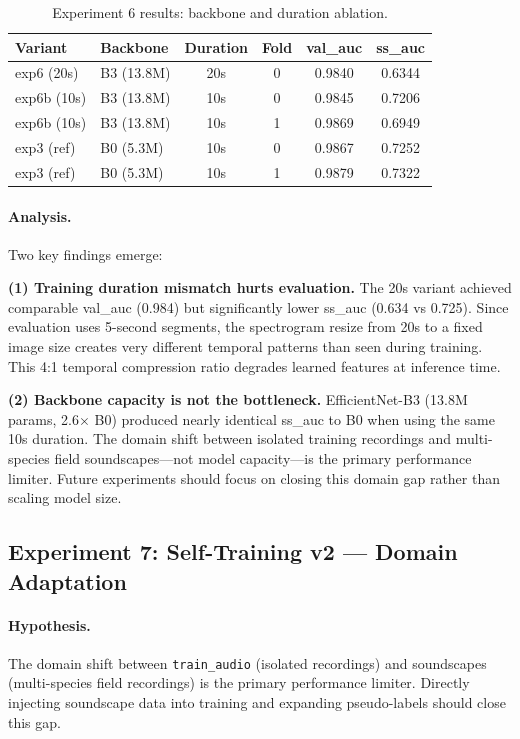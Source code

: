 \begin{table}[h]
\centering
\caption{Experiment 6 results: backbone and duration ablation.}
\label{tab:exp6}
\begin{tabular}{llcccc}
\hline
\textbf{Variant} & \textbf{Backbone} & \textbf{Duration} & \textbf{Fold} & \textbf{val\_auc} & \textbf{ss\_auc} \\
\hline
exp6 (20s)  & B3 (13.8M) & 20s & 0 & 0.9840 & 0.6344 \\
exp6b (10s) & B3 (13.8M) & 10s & 0 & 0.9845 & 0.7206 \\
exp6b (10s) & B3 (13.8M) & 10s & 1 & 0.9869 & 0.6949 \\
\hline
exp3 (ref)  & B0 (5.3M)  & 10s & 0 & 0.9867 & 0.7252 \\
exp3 (ref)  & B0 (5.3M)  & 10s & 1 & 0.9879 & 0.7322 \\
\hline
\end{tabular}
\end{table}

\paragraph{Analysis.}
Two key findings emerge:

\textbf{(1) Training duration mismatch hurts evaluation.}
The 20s variant achieved comparable val\_auc (0.984) but significantly lower
ss\_auc (0.634 vs 0.725). Since evaluation uses 5-second segments, the
spectrogram resize from 20s to a fixed image size creates very different
temporal patterns than seen during training. This 4:1 temporal compression
ratio degrades learned features at inference time.

\textbf{(2) Backbone capacity is not the bottleneck.}
EfficientNet-B3 (13.8M params, 2.6$\times$ B0) produced nearly identical
ss\_auc to B0 when using the same 10s duration. The domain shift between
isolated training recordings and multi-species field soundscapes---not model
capacity---is the primary performance limiter. Future experiments should focus
on closing this domain gap rather than scaling model size.

\subsection{Experiment 7: Self-Training v2 — Domain Adaptation}
\label{sec:exp7}

\paragraph{Hypothesis.}
The domain shift between \texttt{train\_audio} (isolated recordings) and
soundscapes (multi-species field recordings) is the primary performance limiter.
Directly injecting soundscape data into training and expanding pseudo-labels
should close this gap.

